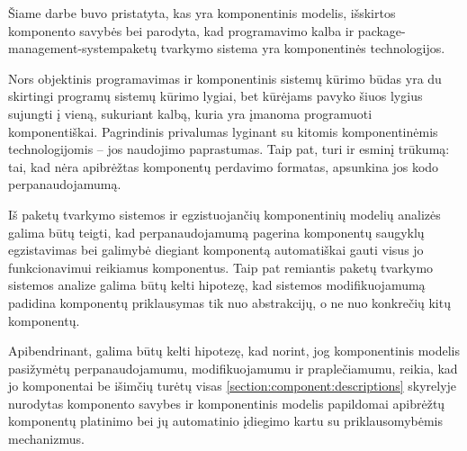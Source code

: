 

Šiame darbe buvo pristatyta, kas yra komponentinis modelis, išskirtos
komponento savybės bei parodyta, kad  programavimo
kalba ir  \gls{package-management-system}{paketų
tvarkymo sistema} yra komponentinės technologijos.

Nors objektinis programavimas ir komponentinis sistemų kūrimo būdas
yra du skirtingi programų sistemų kūrimo lygiai, bet
 kūrėjams pavyko šiuos lygius sujungti į vieną,
sukuriant kalbą, kuria yra įmanoma programuoti komponentiškai.
Pagrindinis  privalumas lyginant su kitomis
komponentinėmis technologijomis – jos naudojimo paprastumas. Taip pat,
 turi ir esminį trūkumą: tai, kad nėra apibrėžtas
 komponentų perdavimo formatas, apsunkina jos kodo
perpanaudojamumą.

Iš  paketų tvarkymo sistemos ir egzistuojančių
komponentinių modelių analizės galima būtų teigti, kad
perpanaudojamumą pagerina komponentų saugyklų egzistavimas bei galimybė
diegiant komponentą automatiškai gauti visus jo funkcionavimui
reikiamus komponentus. Taip pat remiantis  paketų
tvarkymo sistemos analize galima būtų kelti hipotezę, kad
sistemos modifikuojamumą padidina komponentų priklausymas tik nuo
abstrakcijų, o ne nuo konkrečių kitų komponentų.

Apibendrinant, galima būtų kelti hipotezę, kad norint, jog
komponentinis modelis pasižymėtų perpanaudojamumu, modifikuojamumu ir
praplečiamumu, reikia, kad jo komponentai be išimčių turėtų visas
\ref{section:component:descriptions} skyrelyje nurodytas komponento
savybes ir komponentinis modelis papildomai apibrėžtų komponentų
platinimo bei jų automatinio įdiegimo kartu su priklausomybėmis
mechanizmus.
